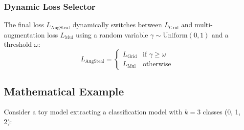 \documentclass{article}
\begin{document}
\subsubsection{Dynamic Loss Selector}
The final loss $L_{\text{AugSteal}}$ dynamically switches between $L_{\text{Grid}}$ and multi-augmentation loss $L_{\text{Mul}}$ using a random variable $\gamma \sim \text{Uniform}(0, 1)$ and a threshold $\omega$:
\begin{equation}
    L_{\text{AugSteal}} = \begin{cases} L_{\text{Grid}} & \text{if } \gamma \ge \omega \\ L_{\text{Mul}} & \text{otherwise} \end{cases}
\end{equation}

\subsection{Mathematical Example}
Consider a toy model extracting a classification model with $k=3$ classes (0, 1, 2):
\end{document}
